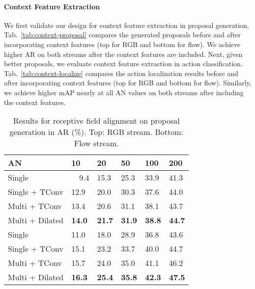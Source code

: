 \documentclass[10pt,twocolumn,letterpaper]{article}
\newcommand\Tstrut{\rule{0pt}{2.2ex}}       \newcommand\Bstrut{\rule[-1.0ex]{0pt}{0pt}} \newcommand{\TBstrut}{\Tstrut\Bstrut}
\begin{document}
\vspace{-3mm}

\paragraph{Context Feature Extraction} We first validate our design for context
feature extraction in proposal generation. Tab.~\ref{tab:context-proposal}
compares the generated proposals before and after incorporating context
features (top for RGB and bottom for flow). We achieve higher AR on both
streams after the context features are included. Next, given better proposals,
we evaluate context feature extraction in action classification.
Tab.~\ref{tab:context-localize} compares the action localization results before
and after incorporating context features (top for RGB and bottom for flow).
Similarly, we achieve higher mAP nearly at all AN values on both streams after
including the context features.

\begin{table}[t]
\centering
 \small
\begin{minipage}{0.48\textwidth}
  \centering
  \begin{tabular}{l||C{0.62cm}C{0.62cm}C{0.62cm}C{0.62cm}C{0.62cm}}
   \hline \TBstrut
   AN              & 10            & 20            & 50            & 100           & 200           \\
   \hline \Tstrut
   Single          & ~~9.4         & 15.3          & 25.3          & 33.9          & 41.3          \\
   Single + TConv  & 12.9          & 20.0          & 30.3          & 37.6          & 44.0          \\
   Multi + TConv   & 13.4          & 20.6          & 31.1          & 38.1          & 43.7          \\ \Bstrut
   Multi + Dilated & \textbf{14.0} & \textbf{21.7} & \textbf{31.9} & \textbf{38.8} & \textbf{44.7} \\
   \hline
   \hline \Tstrut
   Single          & 11.0          & 18.0          & 28.9          & 36.8          & 43.6          \\
   Single + TConv  & 15.1          & 23.2          & 33.7          & 40.0          & 44.7          \\
   Multi + TConv   & 15.7          & 24.0          & 35.0          & 41.1          & 46.2          \\ \Bstrut
   Multi + Dilated & \textbf{16.3} & \textbf{25.4} & \textbf{35.8} & \textbf{42.3} & \textbf{47.5} \\
   \hline
  \end{tabular}
 \end{minipage}
 \vspace{-2mm}
 \caption{\small Results for receptive field alignment on proposal generation
in AR (\%). Top: RGB stream. Bottom: Flow stream.}
\vspace{-1mm}
 \label{tab:receptive}
\end{table}
\end{document}
